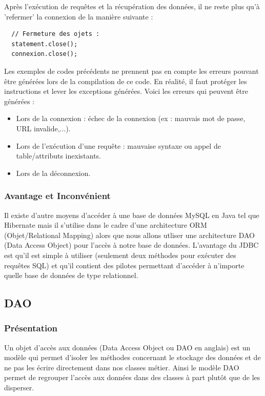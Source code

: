 Après l'exécution de requêtes et la récupération des données, il ne reste plus qu'à 'refermer' la connexion de la manière suivante :
\begin{lstlisting}
  // Fermeture des ojets :
  statement.close();
  connexion.close();
\end{lstlisting}

Les exemples de codes précédents ne prennent pas en compte les erreurs pouvant être générées lors de la compilation de ce code. En réalité, il faut protéger les instructions et lever les exceptions générées. Voici les erreurs qui peuvent être générées :
\begin{itemize}
 \item Lors de la connexion : échec de la connexion (ex : mauvais mot de passe, URL invalide,...).
 \item Lors de l'exécution d'une requête : mauvaise syntaxe ou appel de table/attributs inexistants.
 \item Lors de la déconnexion.
\end{itemize}

\subsubsection{Avantage et Inconvénient}
Il existe d'autre moyens d'accéder à une base de données MySQL en Java tel que Hibernate mais il s'utilise dans le cadre d'une architecture ORM (Objet/Relational Mapping) alors que nous allons utliser une architecture DAO (Data Access Object) pour l'accès à notre base de données. L'avantage du JDBC est qu'il est simple à utiliser (seulement deux méthodes pour exécuter des requêtes SQL) et qu'il contient des pilotes permettant d'accéder à n'importe quelle base de données de type relationnel.


\subsection{DAO}

\subsubsection{Présentation}
Un objet d'accès aux données (Data Access Object ou DAO en anglais) est un modèle qui permet d'isoler les méthodes concernant le stockage des données et de ne pas les écrire directement dans nos classes métier. Ainsi le modèle DAO permet de regrouper l'accès aux données dans des classes à part plutôt que de les disperser. \\


